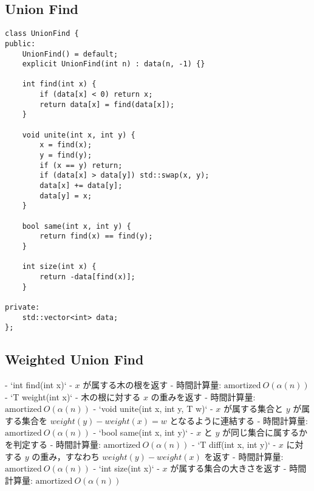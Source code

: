 \subsection{Union Find}

\begin{lstlisting}
class UnionFind {
public:
    UnionFind() = default;
    explicit UnionFind(int n) : data(n, -1) {}

    int find(int x) {
        if (data[x] < 0) return x;
        return data[x] = find(data[x]);
    }

    void unite(int x, int y) {
        x = find(x);
        y = find(y);
        if (x == y) return;
        if (data[x] > data[y]) std::swap(x, y);
        data[x] += data[y];
        data[y] = x;
    }

    bool same(int x, int y) {
        return find(x) == find(y);
    }

    int size(int x) {
        return -data[find(x)];
    }

private:
    std::vector<int> data;
};
\end{lstlisting}

\subsection{Weighted Union Find}

\begin{small}
\begin{markdown}
- `int find(int x)`
    - $x$ が属する木の根を返す
    - 時間計算量: $\mathrm{amortized}\ O(\alpha(n))$
- `T weight(int x)`
    - 木の根に対する $x$ の重みを返す
    - 時間計算量: $\mathrm{amortized}\ O(\alpha(n))$
- `void unite(int x, int y, T w)`
    - $x$ が属する集合と $y$ が属する集合を $weight(y) - weight(x) = w$ となるように連結する
    - 時間計算量: $\mathrm{amortized}\ O(\alpha(n))$
- `bool same(int x, int y)`
    - $x$ と $y$ が同じ集合に属するかを判定する
    - 時間計算量: $\mathrm{amortized}\ O(\alpha(n))$
- `T diff(int x, int y)`
    - $x$ に対する $y$ の重み，すなわち $weight(y) - weight(x)$ を返す
    - 時間計算量: $\mathrm{amortized}\ O(\alpha(n))$
- `int size(int x)`
    - $x$ が属する集合の大きさを返す
    - 時間計算量: $\mathrm{amortized}\ O(\alpha(n))$
\end{markdown}
\end{small}

